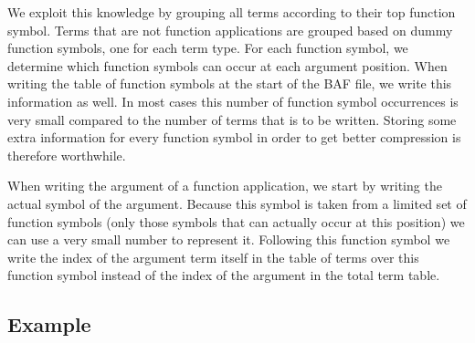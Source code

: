 \documentclass{article}
\begin{document}
We exploit this knowledge by grouping all terms according to their top function symbol.
Terms that are not function applications are grouped based on dummy function symbols, 
one for each term type. For each function symbol, we determine which function symbols can occur 
at each argument position. When writing the table of function symbols at the start of the BAF file, 
we write this information as well. In most cases this number of function symbol occurrences is very small compared 
to the number of terms that is to be written. Storing some extra information for every function symbol in order 
to get better compression is therefore worthwhile.

When writing the argument of a function application, we start by writing the actual symbol of the argument. 
Because this symbol is taken from a limited set of function symbols (only those symbols that can actually occur at 
this position) we can use a very small number to represent it. Following this function symbol we write the 
index of the argument term itself in the table of terms over this function symbol instead of the index of 
the argument in the total term table.  

\subsection{Example}
\end{document}
